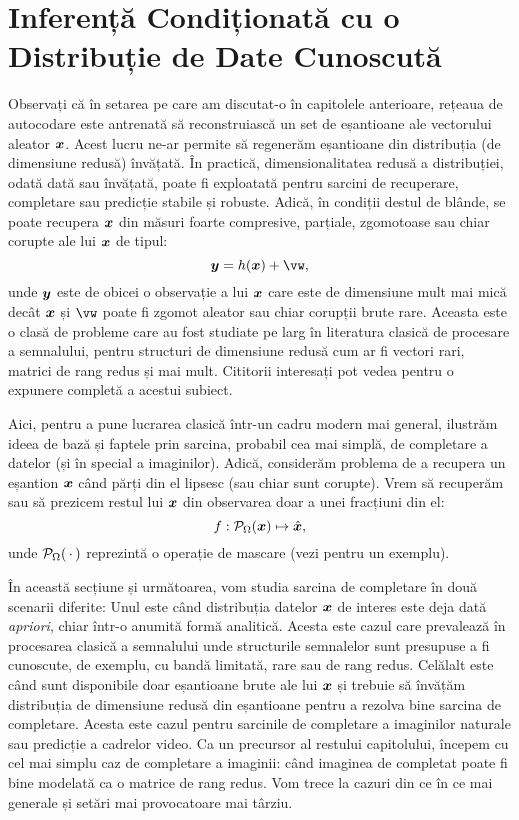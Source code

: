 \documentclass[../../book-main_ro.tex]{subfiles}
\begin{document}
\section{Inferență Condiționată cu o Distribuție de Date Cunoscută}
Observați că în setarea pe care am discutat-o în capitolele anterioare, rețeaua de autocodare este antrenată să reconstruiască un set de eșantioane ale vectorului aleator $\bm{x}$. Acest lucru ne-ar permite să regenerăm eșantioane din distribuția (de dimensiune redusă) învățată. În practică, dimensionalitatea redusă a distribuției, odată dată sau învățată, poate fi exploatată pentru sarcini de recuperare, completare sau predicție stabile și robuste. Adică, în condiții destul de blânde, se poate recupera $\bm{x}$ din măsuri foarte compresive, parțiale, zgomotoase sau chiar corupte ale lui $\bm{x}$ de tipul:
\begin{equation}
    \y = h(\x) + \vw,
\end{equation}
unde $\bm{y}$ este de obicei o observație a lui $\bm{x}$ care este de dimensiune mult mai mică decât $\bm{x}$ și $\vw$ poate fi zgomot aleator sau chiar corupții brute rare. Aceasta este o clasă de probleme care au fost studiate pe larg în literatura clasică de procesare a semnalului, pentru structuri de dimensiune redusă cum ar fi vectori rari, matrici de rang redus și mai mult. Cititorii interesați pot vedea \cite{Wright-Ma-2022} pentru o expunere completă a acestui subiect.

Aici, pentru a pune lucrarea clasică într-un cadru modern mai general, ilustrăm ideea de bază și faptele prin sarcina, probabil cea mai simplă, de completare a datelor (și în special a imaginilor). Adică, considerăm problema de a recupera un eșantion $\bm{x}$ când părți din el lipsesc (sau chiar sunt corupte). Vrem să recuperăm sau să prezicem restul lui $\bm{x}$
din observarea doar a unei fracțiuni din el:
\begin{equation}
f: \mathcal{P}_{\Omega}(\bm{x}) \mapsto \hat{\bm{x}},
\end{equation}
unde $\mathcal{P}_{\Omega}(\,\cdot\,)$ reprezintă o operație de mascare
(vezi  pentru un exemplu).

În această secțiune și următoarea, vom studia sarcina de completare în două scenarii diferite: Unul este când distribuția datelor $\bm{x}$ de interes este deja dată {\em apriori}, chiar într-o anumită formă analitică. Acesta este cazul care prevalează în procesarea clasică a semnalului unde structurile semnalelor sunt presupuse a fi cunoscute, de exemplu, cu bandă limitată, rare sau de rang redus. Celălalt este când sunt disponibile doar eșantioane brute ale lui $\bm{x}$ și trebuie să învățăm distribuția de dimensiune redusă din eșantioane pentru a rezolva bine sarcina de completare. Acesta este cazul pentru sarcinile de completare a imaginilor naturale sau predicție a cadrelor video. Ca un precursor al restului capitolului, începem cu cel mai simplu caz de completare a imaginii: când imaginea de completat poate fi bine modelată ca o matrice de rang redus. Vom trece la cazuri din ce în ce mai generale și setări mai provocatoare mai târziu.
\end{document}
